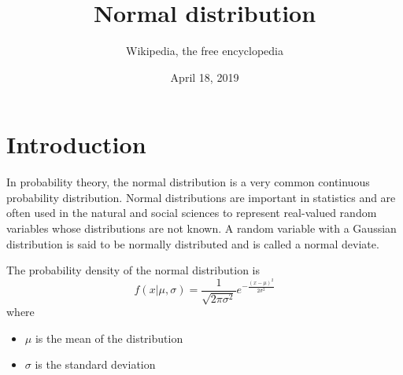 \documentclass[12pt,a4paper]{article}
\title{Normal distribution}
\author{Wikipedia, the free encyclopedia}
\date{April 18, 2019}
\begin{document}
\maketitle
\section{Introduction}
In probability theory, the normal distribution is a very common continuous probability
distribution. Normal distributions are important in statistics and are often used in the natural
and social sciences to represent real-valued random variables whose distributions are not known.
A random variable with a Gaussian distribution is said to be normally distributed and is called a
normal deviate.

The probability density of the normal distribution is
\begin{equation}
  f(x|\mu,\sigma)
  = \frac{1}{\sqrt{2\pi\sigma^2}}
    e^{-\frac{(x-\mu)^2}{2\sigma^2}}
\end{equation}
where
\begin{itemize}
  \item $\mu$ is the mean of the distribution
  \item $\sigma$ is the standard deviation
\end{itemize}
\end{document}
